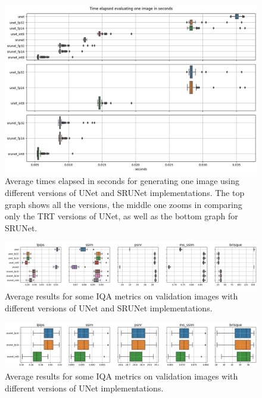 \begin{figure}[h]
  \includegraphics[width=1.0\textwidth]{static/2023_03_02_boxplots_timings_all.png}
  \caption{Average times elapsed in seconds for generating one image using different versions of UNet and SRUNet implementations. The top graph shows all the versions, the middle one zooms in comparing only the TRT versions of UNet, as well as the bottom graph for SRUNet.}
\end{figure}

\begin{figure}[h]
\includegraphics[width=1.0\textwidth]{static/2023_03_02_boxplots_metrics_all.png}
\caption{Average results for some IQA metrics on validation images with different versions of UNet and SRUNet implementations.}
\end{figure}

\begin{figure}[h]
\includegraphics[width=1.0\textwidth]{static/2023_03_02_boxplots_metrics_quant_srunet.png}
\caption{Average results for some IQA metrics on validation images with different versions of UNet implementations.}
\end{figure}

